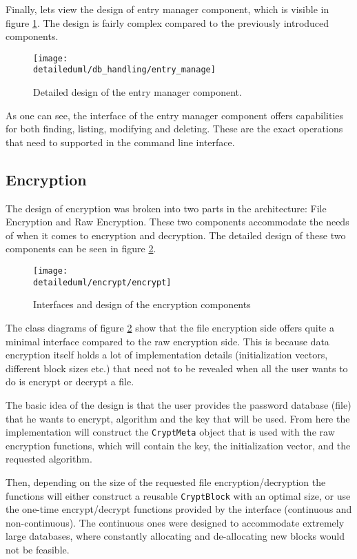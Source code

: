 Finally, lets view the design of entry manager component, which is visible in
figure \ref{dia:entry_manage}. The design is fairly complex compared to the
previously introduced components.

\begin{figure}[H]
    \centering
    \centerline{\texttt{[image: \\detaileduml/db\_handling/entry\_manage]}}
    \caption{Detailed design of the entry manager component.}
    \label{dia:entry_manage}
\end{figure}

As one can see, the interface of the entry manager component offers capabilities
for both finding, listing, modifying and deleting. These are the exact operations
that need to supported in the command line interface.

\subsection{Encryption}

The design of encryption was broken into two parts in the architecture:
File Encryption and Raw Encryption. These two components accommodate the needs
of \pman when it comes to encryption and decryption. The detailed design of
these two components can be seen in figure \ref{dia:encrypt_design}.

\begin{figure}[H]
    \centering
    \centerline{\texttt{[image: \\detaileduml/encrypt/encrypt]}}
    \caption{Interfaces and design of the encryption components}
    \label{dia:encrypt_design}
\end{figure}

The class diagrams of figure \ref{dia:encrypt_design} show that the file
encryption side offers quite a minimal interface compared to the raw encryption
side. This is because data encryption itself holds a lot of implementation
details (initialization vectors, different block sizes etc.) that need not to
be revealed when all the user wants to do is encrypt or decrypt a file.

The basic idea of the design is that the user provides the password database
(file) that he wants to encrypt, algorithm and the key that will be used. From
here the implementation will construct the \texttt{CryptMeta} object that is
used with the raw encryption functions, which will contain the key, the
initialization vector, and the requested algorithm.

Then, depending on the size of the requested file encryption/decryption
the functions will either construct a reusable \texttt{CryptBlock} with an
optimal size, or use the one-time encrypt/decrypt functions provided by the
interface (continuous and non-continuous). The continuous ones were designed
to accommodate extremely large databases, where constantly allocating and
de-allocating new blocks would not be feasible.

